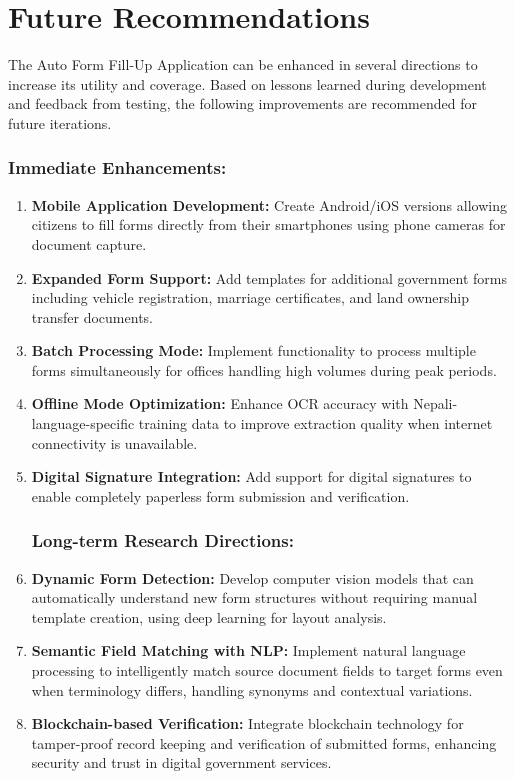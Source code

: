 \documentclass[12pt]{report}
\begin{document}
\section{Future Recommendations}
The Auto Form Fill-Up Application can be enhanced in several directions to increase its utility and coverage. Based on lessons learned during development and feedback from testing, the following improvements are recommended for future iterations.
\subsubsection{Immediate Enhancements:}
\begin{enumerate}[label=\textbullet, leftmargin=*, nosep, itemsep=2pt, topsep=2pt]
\item\textbf{Mobile Application Development: }Create Android/iOS versions allowing citizens to fill forms directly from their smartphones using phone cameras for document capture.

\item\textbf{Expanded Form Support:} Add templates for additional government forms including vehicle registration, marriage certificates, and land ownership transfer documents.

\item\textbf{ Batch Processing Mode:} Implement functionality to process multiple forms simultaneously for offices handling high volumes during peak periods.

\item\textbf{ Offline Mode Optimization:} Enhance OCR accuracy with Nepali-language-specific training  data to improve extraction quality when internet connectivity is unavailable.

\item\textbf{ Digital Signature Integration:} Add support for digital signatures to enable completely paperless form submission and verification.

\subsubsection{Long-term Research Directions:}
\item\textbf{ Dynamic Form Detection:} Develop computer vision models that can automatically understand new form structures without requiring manual template creation, using deep learning for layout analysis.

\item\textbf{Semantic Field Matching with NLP:} Implement natural language processing to intelligently match source document fields to target forms even when terminology differs, handling synonyms and contextual variations.

\item\textbf{Blockchain-based Verification:} Integrate blockchain technology for tamper-proof record keeping and verification of submitted forms, enhancing security and trust in digital  government services.
\end{enumerate}
\end{document}
